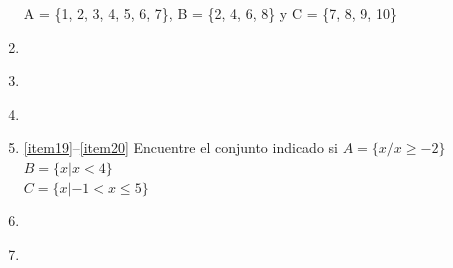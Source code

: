 \documentclass[10pt,twoside]{article}
\begin{document}
\begin{enumerate}
A = \{1, 2, 3, 4, 5, 6, 7\}, \quad B = \{2, 4, 6, 8\} \quad y \quad C = \{7, 8, 9, 10\}
\item \label{item17}
\begin{enumerate}
\end{enumerate}
\item 
\begin{enumerate}
\end{enumerate}
\item
\begin{enumerate}
\end{enumerate}
\item \label{item18}
\begin{enumerate}
\end{enumerate}
\ref{item19}--\ref{item20} Encuentre el conjunto indicado si \quad $A=\{x/x\geq-2\}$ \quad $B=\{x|x<4\}$ \\ $C=\{x|-1<x\leq 5\}$
\newpage 
 \item \label{item19}
 \begin{enumerate}
 \end{enumerate}
 \item \label{item20}
 \begin{enumerate}

\end{enumerate}
\end{enumerate}
\end{document}
